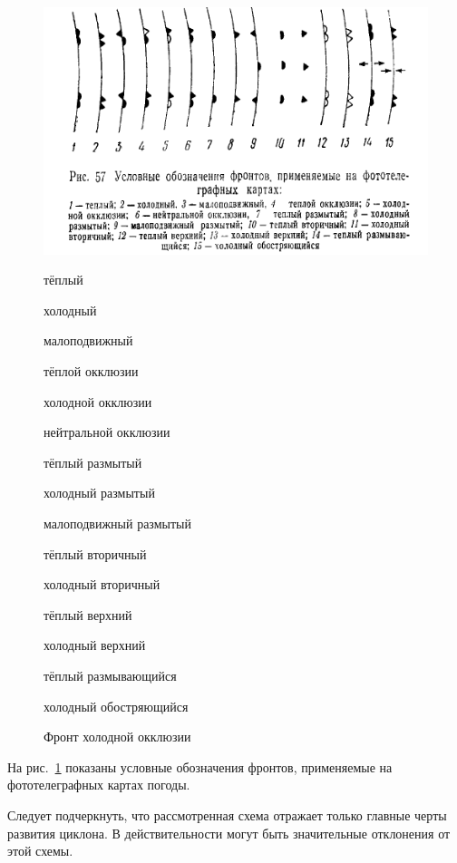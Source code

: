 \documentclass[a4paper, 12pt, twoside, final, book, russian, fittopage, cyremdash, openright]{ncc}
\begin{document}
\begin{figure}[htb]
   \centering
   \includegraphics[scale=1]{11_fronts_marks.pdf}
   \caption{Фронт холодной окклюзии}
   \label{fig:fronts_marks}
   \small
   \begin{enumerate*}[itemjoin={{; }}, label={\arabic*~\--}]
   \item тёплый
   \item холодный
   \item малоподвижный
   \item тёплой окклюзии
   \item холодной окклюзии %
   \item нейтральной окклюзии
   \item тёплый размытый
   \item холодный размытый
   \item малоподвижный размытый
   \item тёплый вторичный %
   \item холодный вторичный
   \item тёплый верхний
   \item холодный верхний
   \item тёплый размывающийся
   \item холодный обостряющийся %
   \end{enumerate*}
\end{figure}

На рис.~\ref{fig:fronts_marks} показаны условные обозначения фронтов,
применяемые на фототелеграфных картах погоды.

Следует подчеркнуть, что рассмотренная схема отражает только главные
черты развития циклона. В действительности могут быть значительные
отклонения от этой схемы.
\end{document}
